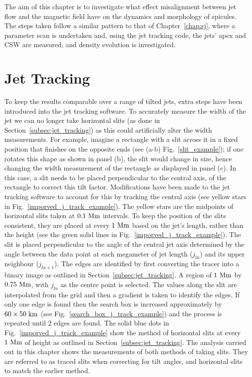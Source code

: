 %
The aim of this chapter is to investigate what effect misalignment between jet flow and the magnetic field have on the dynamics and morphology of spicules. The steps taken follow a similar pattern to that of Chapter~\ref{chap:sj}, where a parameter scan is undertaken and, using the jet tracking code, the jets' apex and CSW are measured, and density evolution is investigated. 
\section{Jet Tracking}
\label{sec:tjt}
To keep the results comparable over a range of tilted jets, extra steps have been introduced into the jet tracking software. To accurately measure the width of the jet we can no longer take horizontal slits (as done in Section~\ref{subsec:jet_tracking}) as this could artificially alter the width measurements. For example, imagine a rectangle with a slit across it in a fixed position that finishes on the opposite ends (see (a-b) Fig.~\ref{slit_example}); if one rotates this shape as shown in panel (b), the slit would change in size, hence changing the width measurement of the rectangle as displayed in panel (c). In this case, a slit needs to be placed perpendicular to the central axis, of the rectangle to correct this tilt factor. \np
%
Modifications have been made to the jet tracking software to account for this by tracking the central axis (see yellow stars in Fig.~\ref{imporved_j_track_example}). The yellow stars are the midpoints of horizontal slits taken at $0.1~\rm{Mm}$ intervals. To keep the position of the slits consistent, they are placed at every $1~\rm{Mm}$ based on the jet's length, rather than the height (see the green solid lines in Fig.~\ref{imporved_j_track_example}). The slit is placed perpendicular to the angle of the central jet axis determined by the angle between the data point at each megameter of jet length ($j_{ln}$) and its upper neighbour ($j_{ln+1}$). The edges are identified by first converting the tracer into a binary image as outlined in Section~\ref{subsec:jet_tracking}. A region of $1~\rm{Mm}$ by $0.75~\rm{Mm}$, with $j_{ln}$ as the centre point is selected. The values along the slit are interpolated from the grid and then a gradient is taken to identify the edges. If only one edge is found then the search box is increased approximately by $60\times 50~\rm{km}$ (see Fig.~\ref{search_box_j_track_example}) and the process is repeated until 2 edges are found. The solid blue dots in  Fig.~\ref{imporved_j_track_example} show the method of horizontal slits at every $1~\rm{Mm}$ of height as outlined in Section~\ref{subsec:jet_tracking}. The analysis carried out in this chapter shows the measurements of both methods of taking slits. They are referred to as traced slits when correcting for tilt angles, and horizontal slits to match the earlier method.
